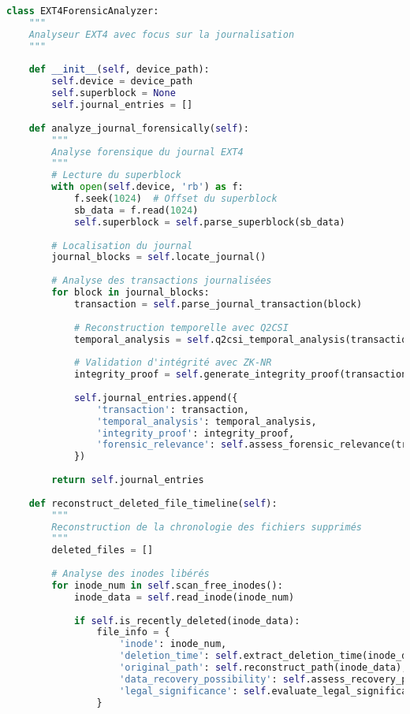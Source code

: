 \begin{lstlisting}[language=Python, caption=Analyseur EXT4 avec reconstruction temporelle]
class EXT4ForensicAnalyzer:
    """
    Analyseur EXT4 avec focus sur la journalisation
    """
    
    def __init__(self, device_path):
        self.device = device_path
        self.superblock = None
        self.journal_entries = []
        
    def analyze_journal_forensically(self):
        """
        Analyse forensique du journal EXT4
        """
        # Lecture du superblock
        with open(self.device, 'rb') as f:
            f.seek(1024)  # Offset du superblock
            sb_data = f.read(1024)
            self.superblock = self.parse_superblock(sb_data)
            
        # Localisation du journal
        journal_blocks = self.locate_journal()
        
        # Analyse des transactions journalisées
        for block in journal_blocks:
            transaction = self.parse_journal_transaction(block)
            
            # Reconstruction temporelle avec Q2CSI
            temporal_analysis = self.q2csi_temporal_analysis(transaction)
            
            # Validation d'intégrité avec ZK-NR
            integrity_proof = self.generate_integrity_proof(transaction)
            
            self.journal_entries.append({
                'transaction': transaction,
                'temporal_analysis': temporal_analysis,
                'integrity_proof': integrity_proof,
                'forensic_relevance': self.assess_forensic_relevance(transaction)
            })
            
        return self.journal_entries
    
    def reconstruct_deleted_file_timeline(self):
        """
        Reconstruction de la chronologie des fichiers supprimés
        """
        deleted_files = []
        
        # Analyse des inodes libérés
        for inode_num in self.scan_free_inodes():
            inode_data = self.read_inode(inode_num)
            
            if self.is_recently_deleted(inode_data):
                file_info = {
                    'inode': inode_num,
                    'deletion_time': self.extract_deletion_time(inode_data),
                    'original_path': self.reconstruct_path(inode_data),
                    'data_recovery_possibility': self.assess_recovery_possibility(inode_data),
                    'legal_significance': self.evaluate_legal_significance(inode_data)
                }
                

\end{lstlisting}
